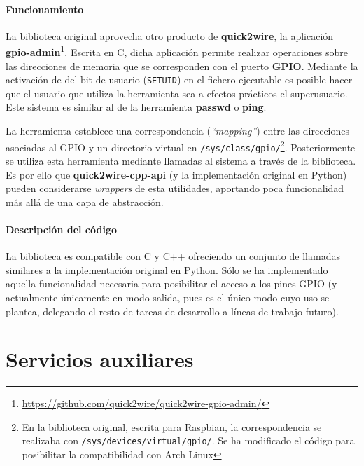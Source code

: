 \paragraph{Funcionamiento\\}

La biblioteca original aprovecha otro producto de \textbf{quick2wire}, la aplicación \textbf{gpio-admin}\footnote{\href{https://github.com/quick2wire/quick2wire-gpio-admin/}{https://github.com/quick2wire/quick2wire-gpio-admin/}}. Escrita en C, dicha aplicación permite realizar operaciones sobre las direcciones de memoria que se corresponden con el puerto \textbf{GPIO}. Mediante la activación de del bit de usuario (\texttt{SETUID}) en el fichero ejecutable es posible hacer que el usuario que utiliza la herramienta sea a efectos prácticos el superusuario. Este sistema es similar al de la herramienta \textbf{passwd} o \textbf{ping}.

La herramienta establece una correspondencia (\textit{``mapping''}) entre las direcciones asociadas al GPIO y un directorio virtual en \texttt{/sys/class/gpio/}\footnote{En la biblioteca original, escrita para Raspbian, la correspondencia se realizaba con \texttt{/sys/devices/virtual/gpio/}. Se ha modificado el código para posibilitar la compatibilidad con Arch Linux}. Posteriormente se utiliza esta herramienta mediante llamadas al sistema a través de la biblioteca. Es por ello que \textbf{quick2wire-cpp-api} (y la implementación original en Python) pueden considerarse \textit{wrappers} de esta utilidades, aportando poca funcionalidad más allá de una capa de abstracción.

\paragraph{Descripción del código}

La biblioteca es compatible con C y C++ ofreciendo un conjunto de llamadas similares a la implementación original en Python. Sólo se ha implementado aquella funcionalidad necesaria para posibilitar el acceso a los pines GPIO (y actualmente únicamente en modo salida, pues es el único modo cuyo uso se plantea, delegando el resto de tareas de desarrollo a líneas de trabajo futuro). %

\section{Servicios auxiliares}
\label{chapter:serviciosauxiliares}
